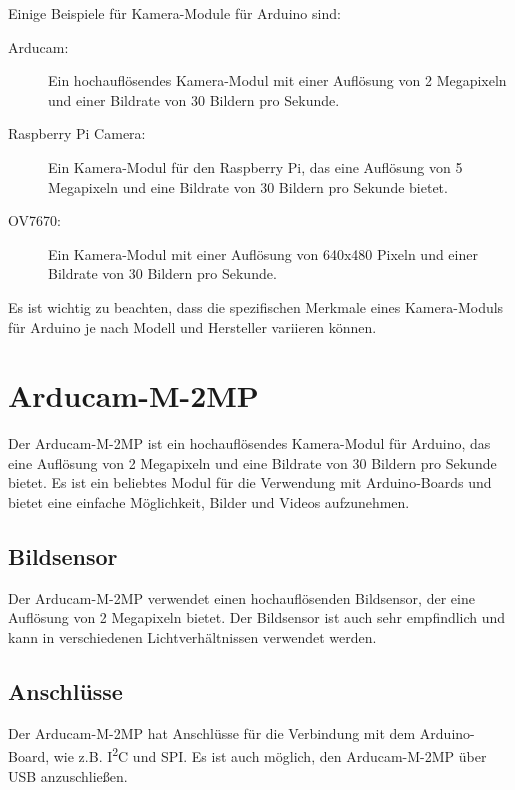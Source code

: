 \bigskip

Einige Beispiele für Kamera-Module für Arduino sind:

  \begin{description}
    \item[Arducam:] Ein hochauflösendes Kamera-Modul mit einer Auflösung von 2 Megapixeln und einer Bildrate von 30 Bildern pro Sekunde. 
    \item [Raspberry Pi Camera:] Ein Kamera-Modul für den Raspberry Pi, das eine Auflösung von 5 Megapixeln und eine Bildrate von 30 Bildern pro Sekunde bietet.  
    \item [OV7670:] Ein Kamera-Modul mit einer Auflösung von 640x480 Pixeln und einer Bildrate von 30 Bildern pro Sekunde.  
  \end{description}


Es ist wichtig zu beachten, dass die spezifischen Merkmale eines Kamera-Moduls für Arduino je nach Modell und Hersteller variieren können.



\section{Arducam-M-2MP}

Der Arducam-M-2MP ist ein hochauflösendes Kamera-Modul für Arduino, das eine Auflösung von 2 Megapixeln und eine Bildrate von 30 Bildern pro Sekunde bietet. Es ist ein beliebtes Modul für die Verwendung mit Arduino-Boards und bietet eine einfache Möglichkeit, Bilder und Videos aufzunehmen. 

\subsection{Bildsensor}

Der Arducam-M-2MP verwendet einen hochauflösenden Bildsensor, der eine Auflösung von 2 Megapixeln bietet. Der Bildsensor ist auch sehr empfindlich und kann in verschiedenen Lichtverhältnissen verwendet werden.

\subsection{Anschlüsse}

Der Arducam-M-2MP hat Anschlüsse für die Verbindung mit dem Arduino-Board, wie z.B. I\textsuperscript{2}C und SPI. Es ist auch möglich, den Arducam-M-2MP über USB anzuschließen.

